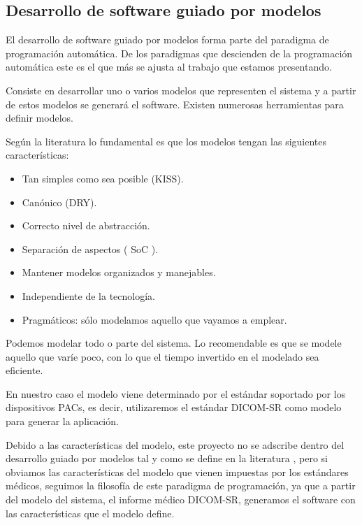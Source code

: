 \subsection{Desarrollo de software guiado por modelos}
El desarrollo de software guiado por modelos forma parte del paradigma de programación automática. De los paradigmas que descienden de la programación automática este es el que más se ajusta al trabajo que estamos presentando.\par
Consiste en desarrollar uno o varios modelos que representen el sistema y a partir de estos modelos se generará el software. Existen numerosas herramientas para definir modelos.\par
Según la literatura \cite{MDA} lo fundamental es que los modelos tengan las siguientes características:
\begin{itemize}
	\item Tan simples como sea posible (KISS).
	\item Canónico (DRY).
	\item Correcto nivel de abstracción.
	\item Separación de aspectos ( SoC ).
	\item Mantener modelos organizados y manejables.
	\item Independiente de la tecnología.
	\item Pragmáticos: sólo modelamos aquello que vayamos a emplear.
\end{itemize}
Podemos modelar todo o parte del sistema. Lo recomendable es que se modele aquello que varíe poco, con lo que el tiempo invertido en el modelado sea eficiente.\medskip \par

En nuestro caso el modelo viene determinado por el estándar soportado por los dispositivos PACs, es decir, utilizaremos el estándar DICOM-SR como modelo para generar la aplicación.\par
Debido a las características del modelo, este proyecto no se adscribe dentro del desarrollo guiado por modelos tal y como se define en la literatura \cite{mdd}, pero si obviamos las características del modelo que vienen impuestas por los estándares médicos, seguimos la filosofía de este paradigma de programación, ya que a partir del modelo del sistema, el informe médico DICOM-SR, generamos el software con las características que el modelo define.\par


